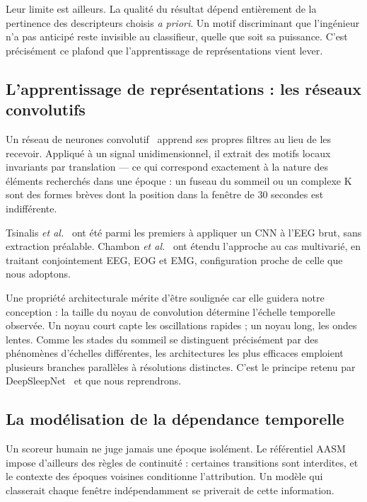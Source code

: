 Leur limite est ailleurs. La qualité du résultat dépend entièrement de la pertinence
des descripteurs choisis \emph{a priori}. Un motif discriminant que l'ingénieur n'a pas
anticipé reste invisible au classifieur, quelle que soit sa puissance. C'est
précisément ce plafond que l'apprentissage de représentations vient lever.

\subsection{L'apprentissage de représentations : les réseaux convolutifs}

Un réseau de neurones convolutif~\cite{lecun1998} apprend ses propres filtres au lieu
de les recevoir. Appliqué à un signal unidimensionnel, il extrait des motifs locaux
invariants par translation — ce qui correspond exactement à la nature des éléments
recherchés dans une époque : un fuseau du sommeil ou un complexe K sont des formes
brèves dont la position dans la fenêtre de 30 secondes est indifférente.

Tsinalis \emph{et al.}~\cite{tsinalis2016} ont été parmi les premiers à appliquer un
CNN à l'EEG brut, sans extraction préalable. Chambon \emph{et al.}~\cite{chambon2018}
ont étendu l'approche au cas multivarié, en traitant conjointement EEG, EOG et EMG,
configuration proche de celle que nous adoptons.

Une propriété architecturale mérite d'être soulignée car elle guidera notre conception :
la taille du noyau de convolution détermine l'échelle temporelle observée. Un noyau
court capte les oscillations rapides ; un noyau long, les ondes lentes. Comme les
stades du sommeil se distinguent précisément par des phénomènes d'échelles différentes,
les architectures les plus efficaces emploient plusieurs branches parallèles à
résolutions distinctes. C'est le principe retenu par
DeepSleepNet~\cite{supratak2017} et que nous reprendrons.

\subsection{La modélisation de la dépendance temporelle}

Un scoreur humain ne juge jamais une époque isolément. Le référentiel AASM impose
d'ailleurs des règles de continuité : certaines transitions sont interdites, et le
contexte des époques voisines conditionne l'attribution. Un modèle qui classerait
chaque fenêtre indépendamment se priverait de cette information.

